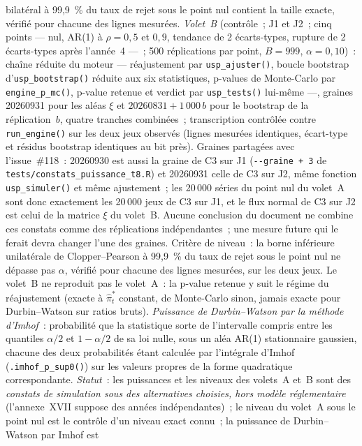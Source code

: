 \documentclass[a4paper,11pt]{article}
\newcommand{\code}[1]{\texttt{\small #1}}
\begin{document}
bilatéral à 99,9~\% du taux de rejet sous le point nul contient la taille exacte, vérifié pour chacune des
lignes mesurées. \emph{Volet~B} (contrôle~; J1 et J2~; cinq points --- nul, AR(1) à $\rho = 0{,}5$ et
$0{,}9$, tendance de 2 écarts-types, rupture de 2 écarts-types après l'année~4 ---~; 500
réplications par point, $B = 999$, $\alpha = 0{,}10$)~: chaîne réduite du moteur --- réajustement
par \code{usp\_ajuster()}, boucle bootstrap d'\code{usp\_bootstrap()} réduite aux six
statistiques, p-values de Monte-Carlo par \code{engine\_p\_mc()}, p-value retenue et verdict par
\code{usp\_tests()} lui-même ---, graines 20260931 pour les aléas $\xi$ et $20260831 + 1\,000\,b$
pour le bootstrap de la réplication~$b$, quatre tranches combinées~; transcription contrôlée
contre \code{run\_engine()} sur les deux jeux observés (lignes mesurées identiques, écart-type et
résidus bootstrap identiques au bit près). Graines partagées avec l'issue~\#118~: 20260930 est aussi la graine de C3 sur J1
(\code{-{}-graine + 3} de \code{tests/constats\_puissance\_t8.R}) et 20260931 celle de C3 sur J2,
même fonction \code{usp\_simuler()} et même ajustement~; les 20\,000 séries du point nul du
volet~A sont donc exactement les 20\,000 jeux de C3 sur J1, et le flux normal de C3 sur J2 est
celui de la matrice $\xi$ du volet~B. Aucune conclusion du document ne combine ces constats
comme des réplications indépendantes~; une mesure future qui le ferait devra changer l'une des
graines. Critère de niveau~: la borne inférieure unilatérale de
Clopper--Pearson à 99,9~\% du taux de rejet sous le point nul ne dépasse pas $\alpha$, vérifié
pour chacune des lignes mesurées, sur les deux jeux. Le volet~B ne reproduit pas le volet~A~: la p-value retenue
y suit le régime du réajustement (exacte à $\hat\pi^*_t$ constant, de Monte-Carlo sinon, jamais
exacte pour Durbin--Watson sur ratios bruts). \emph{Puissance de Durbin--Watson par la méthode
d'Imhof}~: probabilité que la statistique sorte de l'intervalle compris entre les quantiles
$\alpha/2$ et $1-\alpha/2$ de sa loi nulle, sous un aléa AR(1) stationnaire gaussien, chacune des
deux probabilités étant calculée par l'intégrale d'Imhof (\code{.imhof\_p\_sup0()}) sur les valeurs
propres de la forme quadratique correspondante. \emph{Statut}~: les puissances et les niveaux
des volets~A et~B sont des \emph{constats de simulation sous des alternatives choisies, hors modèle
réglementaire} (l'annexe~XVII suppose des années indépendantes)~; le niveau du volet~A sous le
point nul est le contrôle d'un niveau exact connu~; la puissance de Durbin--Watson par Imhof est
\end{document}
